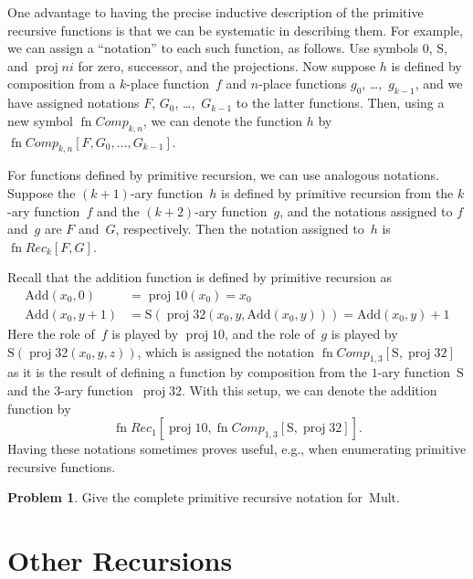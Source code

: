 \documentclass[10pt,a4paper]{article}
\theoremstyle{plain}
\theoremstyle{definition}
\newtheorem{prob}{Problem}[section]
\theoremstyle{remark}
\newcommand*{\olfileid}[3]{}
\newcommand*{\olsection}[1]{\section*{#1}}
\providecommand{\Mult}{\ensuremath{\mathrm{Mult}}}
\providecommand{\Add}{\ensuremath{\mathrm{Add}}}
\providecommand{\Zero}{\ensuremath{0}}
\providecommand{\Succ}{\ensuremath{\mathrm{S}}}
\providecommand{\Proj}{\operatorname{proj}}
\providecommand{\fn}{\operatorname{fn}}
\begin{document}
One advantage to having the precise inductive description of the primitive
recursive functions is that we can be systematic in describing them.
For example, we can assign a ``notation'' to each such function, as
follows. Use symbols $\Zero$, $\Succ$, and $\Proj{n}{i}$ for zero,
successor, and the projections. Now suppose $h$ is defined by
composition from a $k$-place function~$f$ and $n$-place functions $g_0$,
\dots,~$g_{k-1}$, and we have assigned notations $F$, $G_0$,
\dots,~$G_{k-1}$ to the latter functions. Then, using a new symbol
$\fn{Comp}_{k,n}$, we can denote the function $h$ by
$\fn{Comp}_{k,n}[F,G_0,\dots,G_{k-1}]$. 

For functions defined by primitive recursion, we can use analogous
notations. Suppose the $(k+1)$-ary function~$h$ is defined by
primitive recursion from the $k$-ary function~$f$ and the $(k+2)$-ary
function~$g$, and the notations assigned to $f$ and~$g$ are $F$
and~$G$, respectively. Then the notation assigned to~$h$ is
$\fn{Rec}_k[F,G]$. 

Recall that the addition function is defined by primitive recursion as
\begin{align*}
  \Add(x_0, 0) & = \Proj{1}{0}(x_0) = x_0\\
  \Add(x_0, y+1) & = \Succ(\Proj{3}{2}(x_0, y, \Add(x_0, y))) = \Add(x_0, y) +1
\end{align*}
Here the role of~$f$ is played by $\Proj{1}{0}$, and the role of~$g$
is played by $\Succ(\Proj{3}{2}(x_0, y, z))$, which is assigned the
notation $\fn{Comp}_{1,3}[\Succ,\Proj{3}{2}]$ as it is the result of
defining a function by composition from the $1$-ary function~$\Succ$
and the $3$-ary function~$\Proj{3}{2}$. With this setup, we can denote
the addition function by
\[
\fn{Rec}_1[\Proj{1}{0},\fn{Comp}_{1,3}[\Succ,\Proj{3}{2}]].
\]
Having these notations sometimes proves useful, e.g., when enumerating
primitive recursive functions.

\begin{prob}
  Give the complete primitive recursive notation for~$\Mult$.
\end{prob}





\olfileid{cmp}{rec}{ore}
\olsection{Other Recursions}
\end{document}
